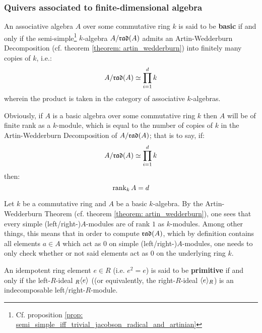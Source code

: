         \subsubsection{Quivers associated to finite-dimensional algebra}
            \begin{definition} \label{def: basic_algebras}
                An associative algebra $A$ over some commutative ring $k$ is said to be \textbf{basic} if and only if the semi-simple\footnote{Cf. proposition \ref{prop: semi_simple_iff_trivial_jacobson_radical_and_artinian}} $k$-algebra $A/\mathfrak{rad}(A)$ admits an Artin-Wedderburn Decomposition (cf. theorem \ref{theorem: artin_wedderburn}) into finitely many copies of $k$, i.e.:
                    $$A/\mathfrak{rad}(A) \simeq \prod_{i = 1}^d k$$
                wherein the product is taken in the category of associative $k$-algebras.
            \end{definition}
            \begin{remark}
                Obviously, if $A$ is a basic algebra over some commutative ring $k$ then $A$ will be of finite rank as a $k$-module, which is equal to the number of copies of $k$ in the Artin-Wedderburn Decomposition of $A/\mathfrak{rad}(A)$; that is to say, if:
                    $$A/\mathfrak{rad}(A) \simeq \prod_{i = 1}^d k$$
                then:
                    $$\operatorname{rank}_k A = d$$
            \end{remark}
            \begin{remark} \label{remark: simple_modules_over_basic_algebras_are_one_dimensional}
                Let $k$ be a commutative ring and $A$ be a basic $k$-algebra. By the Artin-Wedderburn Theorem (cf. theorem \ref{theorem: artin_wedderburn}), one sees that every simple (left/right-)$A$-modules are of rank $1$ as $k$-modules. Among other things, this means that in order to compute $\mathfrak{rad}(A)$, which by definition contains all elements $a \in A$ which act as $0$ on simple (left/right-)$A$-modules, one needs to only check whether or not said elements act as $0$ on the underlying ring $k$.
            \end{remark}
            \begin{definition} \label{def: primitive_idempotents}
                An idempotent ring element $e \in R$ (i.e. $e^2 = e$) is said to be \textbf{primitive} if and only if the left-$R$-ideal ${}_R\langle e\rangle$ ((or equivalently, the right-$R$-ideal $\langle e\rangle_R$) is an indecomposable left/right-$R$-module.
            \end{definition}
